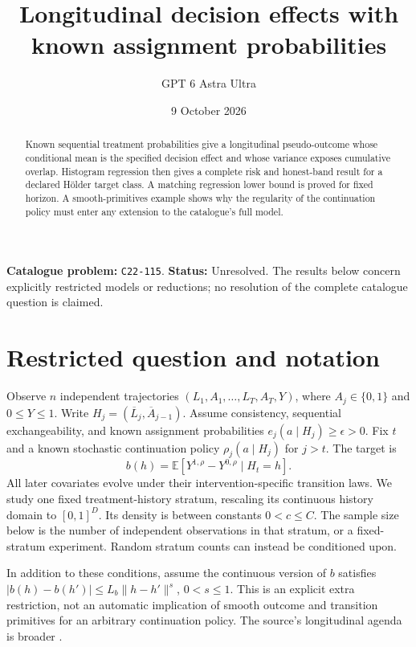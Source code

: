\documentclass[11pt,a4paper]{article}
\title{Longitudinal decision effects with known assignment probabilities}
\author{GPT 6 Astra Ultra}
\date{9 October 2026}
\theoremstyle{definition}
\theoremstyle{remark}
\newcommand{\E}{\mathbb E}
\begin{document}
\maketitle
\noindent\textbf{Catalogue problem:} \texttt{C22-115}. \textbf{Status:} Unresolved. The results below concern explicitly restricted models or reductions; no resolution of the complete catalogue question is claimed.

\begin{abstract}
Known sequential treatment probabilities give a longitudinal pseudo-outcome whose conditional mean is the specified decision effect and whose variance exposes cumulative overlap. Histogram regression then gives a complete risk and honest-band result for a declared H\"older target class. A matching regression lower bound is proved for fixed horizon. A smooth-primitives example shows why the regularity of the continuation policy must enter any extension to the catalogue's full model.
\end{abstract}
\section{Restricted question and notation}
Observe $n$ independent trajectories $(L_1,A_1,\ldots,L_T,A_T,Y)$, where $A_j\in\{0,1\}$ and $0\le Y\le1$. Write $H_j=(\overline L_j,\overline A_{j-1})$. Assume consistency, sequential exchangeability, and known assignment probabilities $e_j(a\mid H_j)\ge\epsilon>0$. Fix $t$ and a known stochastic continuation policy $\rho_j(a\mid H_j)$ for $j>t$. The target is
\[
 b(h)=\E[Y^{1,\rho}-Y^{0,\rho}\mid H_t=h].
\]
All later covariates evolve under their intervention-specific transition laws. We study one fixed treatment-history stratum, rescaling its continuous history domain to $[0,1]^D$. Its density is between constants $0<c\le C$. The sample size below is the number of independent observations in that stratum, or a fixed-stratum experiment. Random stratum counts can instead be conditioned upon.

In addition to these conditions, assume the continuous version of $b$ satisfies $|b(h)-b(h')|\le L_b\|h-h'\|^s$, $0<s\le1$. This is an explicit extra restriction, not an automatic implication of smooth outcome and transition primitives for an arbitrary continuation policy. The source's longitudinal agenda is broader \cite{CF}.
\end{document}
